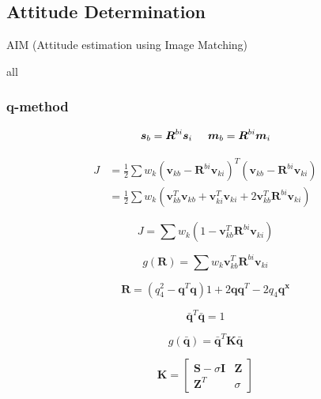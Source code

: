 \documentclass[12pt,a4paper,oneside]{article}
\begin{document}
\subsection{Attitude Determination}
\citet{jenssen2011comparison}\par
AIM (Attitude estimation using Image Matching)\citet{delabie2012highly}\par
all \citet{hall2003spacecraft} \citet{markley1999estimate}
\subsubsection{q-method}

\begin{equation}
\bm{s}_b = \bm{R}^{bi}\bm{s}_i \hspace{0.5cm} \bm{m}_b = \bm{R}^{bi}\bm{m}_i
\end{equation}

\begin{equation}
\begin{split}
J &= \frac{1}{2} \sum w_k (\bm{v}_{kb} - \bm{R}^{bi} \bm{v}_{ki})^T (\bm{v}_{kb} - \bm{R}^{bi} \bm{v}_{ki}) \\ 
&= \frac{1}{2} \sum w_k (\bm{v}_{kb}^T\bm{v}_{kb} + \bm{v}_{ki}^T\bm{v}_{ki} + 2\bm{v}_{kb}^T \bm{R}^{bi} \bm{v}_{ki})
\end{split}
\end{equation}


\begin{equation}
J = \sum w_k (1 - \bm{v}_{kb}^T \bm{R}^{bi} \bm{v}_{ki})
\end{equation}

\begin{equation}
g(\bm{R}) = \sum w_k \bm{v}_{kb}^T \bm{R}^{bi} \bm{v}_{ki}
\end{equation}

\begin{equation}
\bm{R} = (q_4^2 - \bm{q}^T\bm{q})1 + 2\bm{qq}^T - 2q_4\bm{q}^{\bm{x}}
\end{equation}

\begin{equation}
\bm{\bar{q}}^T\bm{\bar{q}} = 1
\end{equation}

\begin{equation}
g(\bm{\bar{q}}) = \bm{\bar{q}}^T\bm{K}\bm{\bar{q}}
\end{equation}

\begin{equation}
\bm{K} = \begin{bmatrix}
\bm{S} - \sigma\bm{I} & \bm{Z} \\
\bm{Z}^T & \sigma
\end{bmatrix}
\end{equation}
\end{document}
